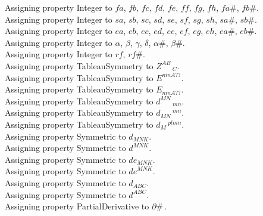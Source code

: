 \documentclass[11pt]{article}
\begin{document}
Assigning property Integer to $fa$, $fb$, $fc$, $fd$, $fe$, $ff$, $fg$, $fh$, $fa\#$, $fb\#$.
\\
Assigning property Integer to $sa$, $sb$, $sc$, $sd$, $se$, $sf$, $sg$, $sh$, $sa\#$, $sb\#$.
\\
Assigning property Integer to $ea$, $eb$, $ec$, $ed$, $ee$, $ef$, $eg$, $eh$, $ea\#$, $eb\#$.
\\
Assigning property Integer to $\alpha$, $\beta$, $\gamma$, $\delta$, $\alpha\#$, $\beta\#$.
\\
Assigning property Integer to $rf$, $rf\#$.
\\
Assigning property TableauSymmetry to ${Z}^{A B}\,_{C}$.
\\
Assigning property TableauSymmetry to ${E}^{m n A??}$.
\\
Assigning property TableauSymmetry to ${E}_{m n A??}$.
\\
Assigning property TableauSymmetry to ${d}^{M N}\,_{m n}$.
\\
Assigning property TableauSymmetry to ${d}_{M N}\,^{m n}$.
\\
Assigning property TableauSymmetry to ${d}_{M}\,^{p l m n}$.
\\
Assigning property Symmetric to ${d}_{M N K}$.
\\
Assigning property Symmetric to ${d}^{M N K}$.
\\
Assigning property Symmetric to ${de}_{M N K}$.
\\
Assigning property Symmetric to ${de}^{M N K}$.
\\
Assigning property Symmetric to ${d}_{A B C}$.
\\
Assigning property Symmetric to ${d}^{A B C}$.
\\
Assigning property PartialDerivative to $\partial{\#}\, $.
\\
\end{document}

